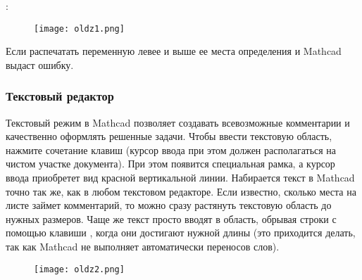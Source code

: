 :
\begin{figure}[h]
	\begin{center}
		\texttt{[image: oldz1.png]}
	\end{center}
\end{figure}

Если распечатать переменную  левее и выше ее места определения и Mathcad выдаст ошибку.

\subsubsection*{Текстовый редактор}
Текстовый режим в Mathcad позволяет создавать всевозможные комментарии и качественно оформлять решенные задачи.
Чтобы ввести текстовую область, нажмите сочетание клавиш  (курсор ввода при этом должен располагаться на чистом участке документа). При этом появится специальная рамка, а курсор ввода приобретет вид красной вертикальной линии.
Набирается текст в Mathcad точно так же, как в любом текстовом редакторе. Если известно, сколько места на листе займет комментарий, то можно сразу растянуть текстовую область до нужных размеров. Чаще же текст просто вводят в область, обрывая строки с помощью клавиши \keys{\enter}, когда они достигают нужной длины (это приходится делать, так как Mathcad не выполняет автоматически переносов слов).

\begin{figure}[h]
	\begin{center}
		\texttt{[image: oldz2.png]}
	\end{center}
\end{figure}

